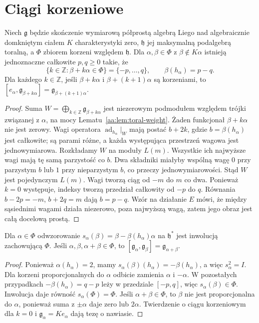 \section{Ciągi korzeniowe}
\begin{twierdzenie}
\label{aa:tw:lie-root-string}
Niech $\mathfrak g$ będzie skończenie wymiarową półprostą algebrą Liego nad algebraicznie domkniętym ciałem $K$ charakterystyki zero, $\mathfrak h$ jej maksymalną podalgebrą toralną, a $\Phi$ zbiorem korzeni względem $\mathfrak h$. Dla $\alpha,\beta\in\Phi$ z $\beta\notin K\alpha$ istnieją jednoznaczne całkowite $p,q\ge0$ takie, że
\[
 \{k\in\mathbb Z:\beta+k\alpha\in\Phi\}=\{-p,\ldots,q\},
 \qquad \beta(h_\alpha)=p-q.
\]
Dla każdego $k\in\mathbb Z$, jeśli $\beta+k\alpha$ i $\beta+(k+1)\alpha$ są korzeniami, to $[e_\alpha,\mathfrak g_{\beta+k\alpha}]=\mathfrak g_{\beta+(k+1)\alpha}$.
\end{twierdzenie}
\begin{proof}
Suma $W=\bigoplus_{k\in\mathbb Z}\mathfrak g_{\beta+k\alpha}$ jest niezerowym podmodułem względem trójki związanej z $\alpha$, na mocy Lematu~\ref{aa:lem:toral-weight}. Żaden funkcjonał $\beta+k\alpha$ nie jest zerowy. Wagi operatora $\operatorname{ad}_{h_\alpha}|_W$ mają postać $b+2k$, gdzie $b=\beta(h_\alpha)$ jest całkowite; są parami różne, a każda występująca przestrzeń wagowa jest jednowymiarowa. Rozkładamy $W$ na moduły $L(m)$. Wszystkie ich najwyższe wagi mają tę samą parzystość co $b$. Dwa składniki miałyby wspólną wagę $0$ przy parzystym $b$ lub $1$ przy nieparzystym $b$, co przeczy jednowymiarowości. Stąd $W$ jest pojedynczym $L(m)$. Wagi tworzą ciąg od $-m$ do $m$ co dwa. Ponieważ $k=0$ występuje, indeksy tworzą przedział całkowity od $-p$ do $q$. Równania $b-2p=-m$, $b+2q=m$ dają $b=p-q$. Wzór na działanie $E$ mówi, że między sąsiednimi wagami działa niezerowo, poza najwyższą wagą, zatem jego obraz jest całą docelową prostą.
\end{proof}

\begin{wniosek}
\label{aa:cor:lie-root-reflection}
Dla $\alpha\in\Phi$ odwzorowanie $s_\alpha(\beta)=\beta-\beta(h_\alpha)\alpha$ na $\mathfrak h^*$ jest inwolucją zachowującą $\Phi$. Jeśli $\alpha,\beta,\alpha+\beta\in\Phi$, to $[\mathfrak g_\alpha,\mathfrak g_\beta]=\mathfrak g_{\alpha+\beta}$.
\end{wniosek}
\begin{proof}
Ponieważ $\alpha(h_\alpha)=2$, mamy $s_\alpha(\beta)(h_\alpha)=-\beta(h_\alpha)$, a więc $s_\alpha^2=I$. Dla korzeni proporcjonalnych do $\alpha$ odbicie zamienia $\alpha$ i $-\alpha$. W pozostałych przypadkach $-\beta(h_\alpha)=q-p$ leży w przedziale $[-p,q]$, więc $s_\alpha(\beta)\in\Phi$. Inwolucja daje równość $s_\alpha(\Phi)=\Phi$. Jeśli $\alpha+\beta\in\Phi$, to $\beta$ nie jest proporcjonalna do $\alpha$, ponieważ suma z $\pm\alpha$ daje zero lub $2\alpha$. Twierdzenie o ciągu korzeniowym dla $k=0$ i $\mathfrak g_\alpha=Ke_\alpha$ dają tezę o nawiasie.
\end{proof}

